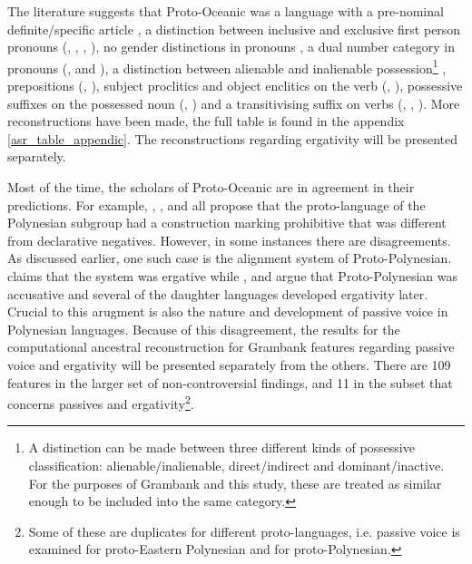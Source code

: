 \documentclass[draft,10pt]{article} %
\begin{document}
The literature suggests that Proto-Oceanic was a language with a pre-nominal definite/specific article \citep[136]{crowley1985common}, a distinction between inclusive and exclusive first person pronouns (\citet[112]{pawley1973some}, \citet[184]{crowley1985common}, \citet[500]{ross2004morphosyntactic}, \citet[67, 75]{lynchrosscrowley_proto_grammar_oceanic}), no gender distinctions in pronouns \citep[498]{ross2004morphosyntactic}, a dual number category in pronouns (\citet[498]{ross2004morphosyntactic}, \citet[69]{lynchrosscrowley_proto_grammar_oceanic} and \citet[173]{pawley1973some}), a distinction between alienable and inalienable possession\footnote{A distinction can be made between three different kinds of possessive classification: alienable/inalienable, direct/indirect and dominant/inactive. For the purposes of Grambank and this study, these are treated as similar enough to be included into the same category.} \citep[69]{lynchrosscrowley_proto_grammar_oceanic}, prepositions (\citet[167]{pawley1973some}, \citet[498]{ross2004morphosyntactic}), subject proclitics and object enclitics on the verb (\citet[498-499]{ross2004morphosyntactic}, \citet[83]{lynchrosscrowley_proto_grammar_oceanic}), possessive suffixes on the possessed noun (\citet[495]{ross2004morphosyntactic}, \citet[155]{pawley1973some}) and a transitivising suffix on verbs (\citet[352]{pawley1970change}, \citet[171]{pawley1973some}, \citet[80, 92]{lynchrosscrowley_proto_grammar_oceanic}). More reconstructions have been made, the full table is found in the appendix \ref{asr_table_appendic}. The reconstructions regarding ergativity will be presented separately.

Most of the time, the scholars of Proto-Oceanic are in agreement in their predictions. For example, \citet[142]{pawley1973some}, \citet[292]{ross2007two}, \citet[xiii, 125]{clark1976aspects} and \citet[89]{lynchrosscrowley_proto_grammar_oceanic} all propose that the proto-language of the Polynesian subgroup had a construction marking prohibitive that was different from declarative negatives. However, in some instances there are disagreements. As discussed earlier, one such case is the alignment system of Proto-Polynesian. \citet{clark1976aspects} claims that the system was ergative while \citet{hale_1968}, \citet{hohepa_1967,hohepa_1969} and \citet{chung1978} argue that Proto-Polynesian was accusative and several of the daughter languages developed ergativity later. Crucial to this arugment is also the nature and development of passive voice in Polynesian languages. Because of this disagreement, the results for the computational ancestral reconstruction for Grambank features regarding passive voice and ergativity will be presented separately from the others. There are 109 features in the larger set of non-controversial findings, and 11 in the subset that concerns passives and ergativity\footnote{Some of these are duplicates for different proto-languages, i.e. passive voice is examined for proto-Eastern Polynesian and for proto-Polynesian.}.
\end{document}
